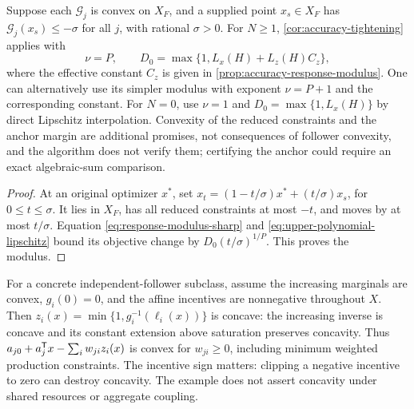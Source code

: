 \begin{corollary}
\label{cor:accuracy-anchor}
Suppose each $\mathcal G_j$ is convex on $X_F$, and a supplied point
$x_s\in X_F$ has $\mathcal G_j(x_s)\le-\sigma$ for all $j$, with
rational $\sigma>0$. For $N\ge1$, \cref{cor:accuracy-tightening} applies with
\[
 \nu=P,\qquad D_0=\max\{1,L_x(H)+L_z(H)C_z\},
\]
where the effective constant $C_z$ is given in
\cref{prop:accuracy-response-modulus}. One can alternatively use its
simpler modulus with exponent $\nu=P+1$ and the corresponding constant.
For $N=0$, use $\nu=1$ and $D_0=\max\{1,L_x(H)\}$ by direct
Lipschitz interpolation. Convexity of the reduced constraints and the
anchor margin are additional promises, not consequences of follower
convexity, and the algorithm does not verify them; certifying the anchor
could require an exact algebraic-sum comparison.
\end{corollary}
\begin{proof}
At an original optimizer $x^*$, set
$x_t=(1-t/\sigma)x^*+(t/\sigma)x_s$, for $0\le t\le\sigma$.
It lies in $X_F$, has all reduced constraints at most $-t$, and moves
by at most $t/\sigma$. Equation \eqref{eq:response-modulus-sharp}
and \eqref{eq:upper-polynomial-lipschitz} bound its objective change
by $D_0(t/\sigma)^{1/P}$. This proves the modulus.
\end{proof}

For a concrete independent-follower subclass, assume the increasing
marginals are convex, $g_i(0)=0$, and the affine incentives are
nonnegative throughout $X$. Then
$z_i(x)=\min\{1,g_i^{-1}(\ell_i(x))\}$ is concave: the increasing
inverse is concave and its constant extension above saturation preserves
concavity. Thus $a_{j0}+a_j^{\mathsf T} x-\sum_iw_{ji}z_i(x)$ is convex
for $w_{ji}\ge0$, including minimum weighted production constraints.
The incentive sign matters: clipping a negative incentive to zero can
destroy concavity. The example does not assert concavity under shared
resources or aggregate coupling.

